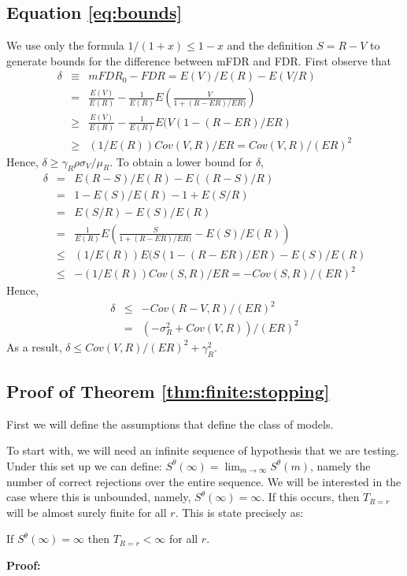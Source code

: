 \documentclass[12pt]{article}
\begin{document}
\subsection*{Equation \ref{eq:bounds}}
We use only the formula $1/(1+x) \le 1 - x$ and the definition $S=R-V$ to
generate bounds for the difference between mFDR and FDR.  First observe that
\begin{eqnarray*}
\delta &\equiv& mFDR_0 - FDR = E(V)/E(R) - E(V/R) \\
          & =    &  \frac{E(V)}{E(R)} - \frac{1}{E(R)}E\left(\frac{V}{1 + (R - ER)/ER)}\right) \\
          & \ge  & \frac{E(V)}{E(R)} - \frac{1}{E(R)}E(V(1 - (R - ER)/ER) \\
          & \ge  &  (1/E(R))Cov(V,R)/ER = Cov(V,R)/(ER)^2 
\end{eqnarray*}
Hence, $\delta \ge \gamma_R\rho \sigma_V/\mu_R$.
To obtain a lower bound for $\delta$,
\begin{eqnarray*}
  \delta & = & E(R-S)/E(R) - E((R-S)/R) \\
            & = & 1 - E(S)/E(R) - 1 + E(S/R) \\
            & = & E(S/R) - E(S)/E(R) \\
            & = & \frac{1}{E(R)}E\left(\frac{S}{1 + (R - ER)/ER)} - E(S)/E(R)\right) \\
            & \le&  (1/E(R))E(S(1 - (R - ER)/ER) - E(S)/E(R) \\
            & \le&  -(1/E(R))Cov(S,R)/ER = -Cov(S,R)/(ER)^2 
\end{eqnarray*}
Hence,
\begin{eqnarray*}
  \delta & \le  & -Cov(R-V,R)/(ER)^2 \\
            & = & (-\sigma^2_R + Cov(V,R))/(ER)^2
\end{eqnarray*}
As a result, $\delta \le Cov(V,R)/(ER)^2 + \gamma^2_R$.

\subsection{Proof of Theorem \ref{thm:finite:stopping}} 

First we will define the assumptions that define the class of models.

To start with, we will need an infinite sequence of hypothesis that we
 are testing.  Under this set up we can define: $S^\theta(\infty) =
 \lim_{m \to \infty} S^\theta(m)$, namely the number of correct
 rejections over the entire sequence.  We will be interested in the
 case where this is unbounded, namely, $S^\theta(\infty) = \infty$.
  If this occurs, then $T_{R=r}$ will be almost surely finite for all
 $r$.  This is state precisely as:
\begin{lemma}
If $S^\theta(\infty) = \infty$ then $T_{R=r} < \infty$ for all $r$.
\end{lemma}
{\bf Proof:}
\end{document}
